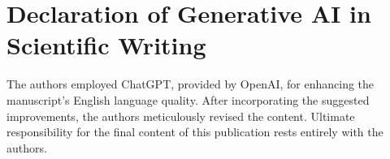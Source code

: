 \documentclass[preprint,review,12pt]{elsarticle}%
\begin{document}
\section*{Declaration of Generative AI in Scientific Writing}
The authors employed ChatGPT, provided by OpenAI, for enhancing the manuscript's English language quality. After incorporating the suggested improvements, the authors meticulously revised the content. Ultimate responsibility for the final content of this publication rests entirely with the authors.
\label{declaration of generative ai in scientific writing}


\clearpage
\end{document}
